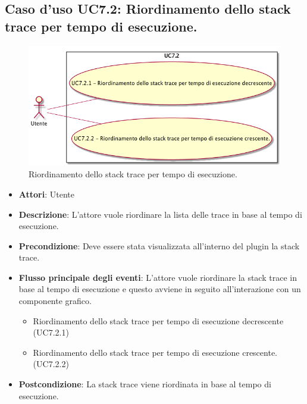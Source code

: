 \subsection{Caso d'uso UC7.2: Riordinamento dello stack trace per tempo di esecuzione.}
\begin{figure} [H]
\centering
\includegraphics[scale=0.45]{./UC/UC7-2.png}
\caption{Riordinamento dello stack trace per tempo di esecuzione.}\label{}
\end{figure}
\begin{itemize}
\item \textbf{Attori}: Utente
\item \textbf{Descrizione}: L'attore vuole riordinare la lista delle trace in base al tempo di esecuzione.
\item \textbf{Precondizione}: Deve essere stata visualizzata all'interno del plugin la stack trace.
\item \textbf{Flusso principale degli eventi}: L'attore vuole riordinare la stack trace in base al tempo di esecuzione e questo avviene in seguito all'interazione con un componente grafico.
\begin{itemize}
\item Riordinamento dello stack trace per tempo di esecuzione decrescente (UC7.2.1)
\item Riordinamento dello stack trace per tempo di esecuzione crescente. (UC7.2.2)
\end{itemize}
\item \textbf{Postcondizione}: La stack trace viene riordinata in base al tempo di esecuzione.
\end{itemize}

